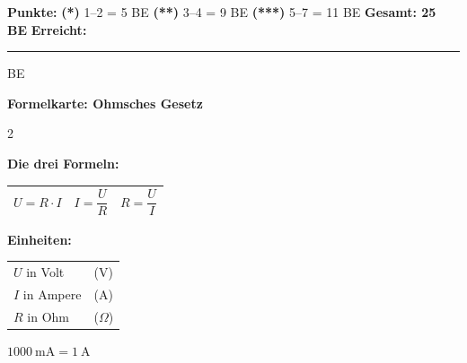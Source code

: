 \documentclass[10pt, a4paper]{article}
\newcommand{\luecke}[1]{\rule{#1}{0.4pt}}
\newcommand{\niveauEins}{\textcolor{stern1}{\textbf{(*)}}}
\newcommand{\niveauZwei}{\textcolor{stern2}{\textbf{(**)}}}
\newcommand{\niveauDrei}{\textcolor{stern3}{\textbf{(***)}}}
\begin{document}
\begin{tcolorbox}[colback=hellgrau, colframe=grau, boxrule=0.5pt, arc=0pt, left=4pt, right=4pt, top=2pt, bottom=2pt]
\small
\textbf{Punkte:}
\niveauEins{} 1--2 = 5 BE \quad
\niveauZwei{} 3--4 = 9 BE \quad
\niveauDrei{} 5--7 = 11 BE \quad
\textbf{Gesamt: 25 BE}
\hfill
\textbf{Erreicht:} \luecke{1cm} BE
\end{tcolorbox}


\newpage

\begin{center}
    {\large\textbf{\textcolor{physik}{Formelkarte: Ohmsches Gesetz}}}
\end{center}

\vspace{0.5em}

\begin{multicols}{2}

\begin{formelbox}
\begin{center}
\textbf{Die drei Formeln:}

\vspace{0.5em}

\begin{tabular}{|c|c|c|}
\hline
$U = R \cdot I$ & $I = \dfrac{U}{R}$ & $R = \dfrac{U}{I}$ \\[0.8em]
\hline
\end{tabular}

\vspace{0.8em}

\textbf{Einheiten:}

\begin{tabular}{ll}
$U$ in Volt & (V) \\
$I$ in Ampere & (A) \\
$R$ in Ohm & ($\Omega$) \\
\end{tabular}

\vspace{0.5em}

$\SI{1000}{\milli\ampere} = \SI{1}{\ampere}$

\end{center}
\end{formelbox}

\end{multicols}
\end{document}
